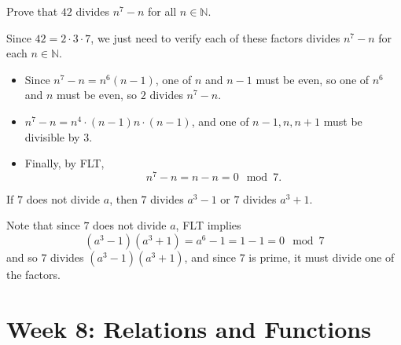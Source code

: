 \documentclass[11pt,dvipsnames]{book}
\numberwithin{figure}{section} %
\numberwithin{table}{section} %
\begin{document}

\begin{exercise}
Prove that $42$ divides $n^7-n$ for all $n\in\mathbb{N}$.
\begin{solution}
Since $42 = 2\cdot 3 \cdot 7$, we just need to verify each of these factors divides $n^7-n$ for each $n\in\mathbb{N}$.
\begin{itemize}
\item Since $n^7-n=n^6(n-1)$, one of $n$ and $n-1$ must be even, so one of $n^6$ and $n$ must be even, so $2$ divides $n^{7}-n$.
\item $n^7-n = n^4\cdot (n-1)n\cdot (n-1)$, and one of $n-1,n,n+1$ must be divisible by 3.
\item Finally, by FLT,
\[
n^7-n = n-n=0 \mod 7.
\]
\end{itemize}
\end{solution}
\end{exercise}

\begin{exercise}
If $7$ does not divide $a$, then $7$ divides $a^3-1$ or $7$ divides $a^3+1$.
\begin{solution}

Note that since $7$ does not divide $a$, FLT implies
\[
(a^{3}-1)(a^3+1) = a^6-1 = 1-1=0 \mod 7
\]
and so $7$ divides $(a^{3}-1)(a^3+1) $, and since $7$ is prime, it must divide one of the factors.
\end{solution}
\end{exercise}

%
%

\part{Week 8: Relations and Functions}
\end{document}
